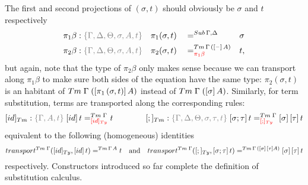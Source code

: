 \documentclass[a4paper,UKenglish,numberwithinsect,cleveref,thm-restate]{lipics-v2021}
\begin{document}

The first and second projections of $(\sigma, t)$ should obviously be $\sigma$ and $t$ respectively
\begin{alignat*}{5}
  \pi_1\beta      & : \implicit{\Gamma, \Delta, \Theta, \sigma, A, t} && \pi_1(\sigma , t)        && =^{\Sub\,\Gamma,\Delta} &&  \sigma \\
  \pi_2\beta      & : \implicit{\Gamma, \Delta, \Theta, \sigma, A, t} && \pi_2(\sigma , t)        && =^{\Tm\,\Gamma\,([\blank]\,A)}_{\alert{\pi_1\beta}} &&  t, 
\end{alignat*}
but again, note that the type of $\pi_2\beta$ only makes sense because we can transport along $\pi_1\beta$ to make sure both sides of the equation have the same type: $\pi_2(\sigma, t)$ is an habitant of $\Tm\;\Gamma\;([\pi_1\,(\sigma, t)]\,A)$ instead of $\Tm\;\Gamma\;([\sigma]\,A)$.
%
Similarly, for term substitution, terms are transported along the corresponding rules:
\[
  [\idS]_{\Tm} : \implicit{\Gamma, A, t}\; {[\idS]\,t} =^{\Tm\;\Gamma}_{\alert{[\idS]_\Ty}} t
  \qquad\qquad
  [;]_{\Tm}    : \implicit{\Gamma, \Delta, \Theta, \sigma, \tau, t}\; {[\sigma ; \tau]\,t} =^{\Tm\;\Gamma}_{\alert{[;]_{\Ty}}}{[ \sigma ]\,[ \tau ]\,t}
\]
equivalent to the following (homogeneous) identities
\[
  \transfib{\Tm\;\Gamma}{[\idS]_{\Ty}}{[\idS]\,t} =^{\Tm\,\Gamma\,A} t
  \quad\text{and}\quad
  \transfib{\Tm\;\Gamma}{[;]_{\Ty}}{[\sigma;\tau]\,t} =^{\Tm\,\Gamma\,([\sigma]\,[\tau]A)} [\sigma]\,[\tau]\,t
\]
respectively.
Constructors introduced so far complete the definition of substitution calculus.
\end{document}
